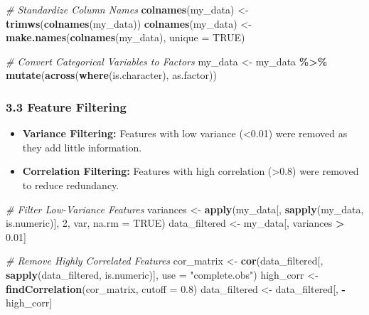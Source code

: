 \documentclass[
]{article}
\newenvironment{Shaded}{\begin{snugshade}}{\end{snugshade}}
\newcommand{\AttributeTok}[1]{\textcolor[rgb]{0.13,0.29,0.53}{#1}}
\newcommand{\CommentTok}[1]{\textcolor[rgb]{0.56,0.35,0.01}{\textit{#1}}}
\newcommand{\ConstantTok}[1]{\textcolor[rgb]{0.56,0.35,0.01}{#1}}
\newcommand{\DecValTok}[1]{\textcolor[rgb]{0.00,0.00,0.81}{#1}}
\newcommand{\FloatTok}[1]{\textcolor[rgb]{0.00,0.00,0.81}{#1}}
\newcommand{\FunctionTok}[1]{\textcolor[rgb]{0.13,0.29,0.53}{\textbf{#1}}}
\newcommand{\NormalTok}[1]{#1}
\newcommand{\OtherTok}[1]{\textcolor[rgb]{0.56,0.35,0.01}{#1}}
\newcommand{\SpecialCharTok}[1]{\textcolor[rgb]{0.81,0.36,0.00}{\textbf{#1}}}
\newcommand{\StringTok}[1]{\textcolor[rgb]{0.31,0.60,0.02}{#1}}
\begin{document}
\begin{Shaded}
\begin{Highlighting}[]
\CommentTok{\# Standardize Column Names}
\FunctionTok{colnames}\NormalTok{(my\_data) }\OtherTok{\textless{}{-}} \FunctionTok{trimws}\NormalTok{(}\FunctionTok{colnames}\NormalTok{(my\_data))}
\FunctionTok{colnames}\NormalTok{(my\_data) }\OtherTok{\textless{}{-}} \FunctionTok{make.names}\NormalTok{(}\FunctionTok{colnames}\NormalTok{(my\_data), }\AttributeTok{unique =} \ConstantTok{TRUE}\NormalTok{)}

\CommentTok{\# Convert Categorical Variables to Factors}
\NormalTok{my\_data }\OtherTok{\textless{}{-}}\NormalTok{ my\_data }\SpecialCharTok{\%\textgreater{}\%} \FunctionTok{mutate}\NormalTok{(}\FunctionTok{across}\NormalTok{(}\FunctionTok{where}\NormalTok{(is.character), as.factor))}
\end{Highlighting}
\end{Shaded}

\subsubsection{\texorpdfstring{\textbf{3.3 Feature
Filtering}}{3.3 Feature Filtering}}\label{feature-filtering}

\begin{itemize}
\item
  \textbf{Variance Filtering:} Features with low variance
  (\textless0.01) were removed as they add little information.
\item
  \textbf{Correlation Filtering:} Features with high correlation
  (\textgreater0.8) were removed to reduce redundancy.
\end{itemize}

\begin{Shaded}
\begin{Highlighting}[]
\CommentTok{\# Filter Low{-}Variance Features}
\NormalTok{variances }\OtherTok{\textless{}{-}} \FunctionTok{apply}\NormalTok{(my\_data[, }\FunctionTok{sapply}\NormalTok{(my\_data, is.numeric)], }\DecValTok{2}\NormalTok{, var, }\AttributeTok{na.rm =} \ConstantTok{TRUE}\NormalTok{)}
\NormalTok{data\_filtered }\OtherTok{\textless{}{-}}\NormalTok{ my\_data[, variances }\SpecialCharTok{\textgreater{}} \FloatTok{0.01}\NormalTok{]}

\CommentTok{\# Remove Highly Correlated Features}
\NormalTok{cor\_matrix }\OtherTok{\textless{}{-}} \FunctionTok{cor}\NormalTok{(data\_filtered[, }\FunctionTok{sapply}\NormalTok{(data\_filtered, is.numeric)], }\AttributeTok{use =} \StringTok{"complete.obs"}\NormalTok{)}
\NormalTok{high\_corr }\OtherTok{\textless{}{-}} \FunctionTok{findCorrelation}\NormalTok{(cor\_matrix, }\AttributeTok{cutoff =} \FloatTok{0.8}\NormalTok{)}
\NormalTok{data\_filtered }\OtherTok{\textless{}{-}}\NormalTok{ data\_filtered[, }\SpecialCharTok{{-}}\NormalTok{high\_corr]}
\end{Highlighting}
\end{Shaded}
\end{document}
